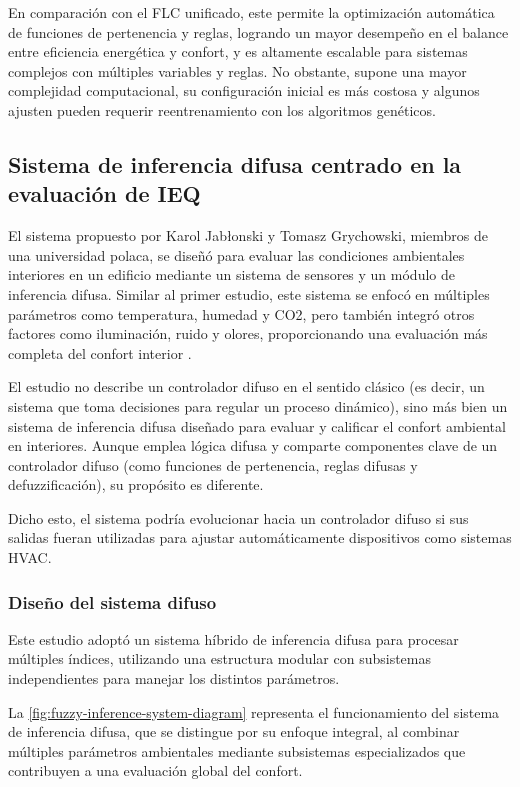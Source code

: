 En comparación con el FLC unificado, este permite la optimización automática de funciones de pertenencia y reglas, logrando un mayor desempeño en el balance entre eficiencia energética y confort, y es altamente escalable para sistemas complejos con múltiples variables y reglas. No obstante, supone una mayor complejidad computacional, su configuración inicial es más costosa y algunos ajusten pueden requerir reentrenamiento con los algoritmos genéticos.

\subsection{Sistema de inferencia difusa centrado en la evaluación de IEQ}

El sistema propuesto por Karol Jabłonski y Tomasz Grychowski, miembros de una universidad polaca, se diseñó para evaluar las condiciones ambientales interiores en un edificio mediante un sistema de sensores y un módulo de inferencia difusa. Similar al primer estudio, este sistema se enfocó en múltiples parámetros como temperatura, humedad y CO2, pero también integró otros factores como iluminación, ruido y olores, proporcionando una evaluación más completa del confort interior \parencite{jablonski2018fuzzy}.

El estudio no describe un controlador difuso en el sentido clásico (es decir, un sistema que toma decisiones para regular un proceso dinámico), sino más bien un sistema de inferencia difusa diseñado para evaluar y calificar el confort ambiental en interiores. Aunque emplea lógica difusa y comparte componentes clave de un controlador difuso (como funciones de pertenencia, reglas difusas y defuzzificación), su propósito es diferente.

Dicho esto, el sistema podría evolucionar hacia un controlador difuso si sus salidas fueran utilizadas para ajustar automáticamente dispositivos como sistemas HVAC.

\subsubsection{Diseño del sistema difuso}

Este estudio adoptó un sistema híbrido de inferencia difusa para procesar múltiples índices, utilizando una estructura modular con subsistemas independientes para manejar los distintos parámetros.

La \autoref{fig:fuzzy-inference-system-diagram} representa el funcionamiento del sistema de inferencia difusa, que se distingue por su enfoque integral, al combinar múltiples parámetros ambientales mediante subsistemas especializados que contribuyen a una evaluación global del confort. 

